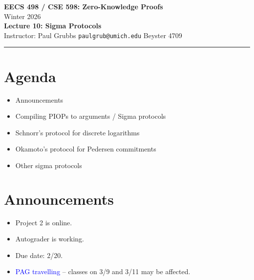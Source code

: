 \documentclass[11pt]{article}
\theoremstyle{plain}
\theoremstyle{definition}
\begin{document}
\begin{center}
  {\LARGE \textbf{EECS 498 / CSE 598: Zero-Knowledge Proofs}}\\[6pt]
  {\large Winter 2026}\\[4pt]
  {\large \textbf{Lecture 10: Sigma Protocols}}\\[4pt]
  {\large Instructor: Paul Grubbs \quad \texttt{paulgrub@umich.edu} \quad Beyster 4709}
\end{center}
\hrule
\vspace{1em}

\section*{Agenda}
\begin{itemize}
  \item Announcements
  \item Compiling PIOPs to arguments / Sigma protocols
  \item Schnorr's protocol for discrete logarithms
  \item Okamoto's protocol for Pedersen commitments
  \item Other sigma protocols
\end{itemize}

\section{Announcements}

\begin{itemize}
  \item Project 2 is online.
  \item Autograder is working.
  \item Due date: 2/20.
  \item \textcolor{blue}{PAG travelling} -- classes on 3/9 and 3/11 may be affected.
\end{itemize}

\end{document}
